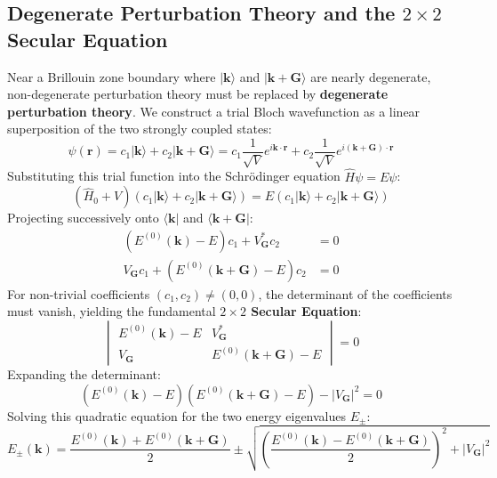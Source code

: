 \documentclass[11pt,a4paper]{article}
\newcommand{\vb}[1]{\mathbf{#1}}
\begin{document}
\subsection{Degenerate Perturbation Theory and the $2\times 2$ Secular Equation}
Near a Brillouin zone boundary where $|\vb{k}\rangle$ and $|\vb{k}+\vb{G}\rangle$ are nearly degenerate, non-degenerate perturbation theory must be replaced by \textbf{degenerate perturbation theory}. We construct a trial Bloch wavefunction as a linear superposition of the two strongly coupled states:
\begin{equation}
\psi(\vb{r}) = c_1 |\vb{k}\rangle + c_2 |\vb{k}+\vb{G}\rangle = c_1 \frac{1}{\sqrt{V}}e^{i\vb{k}\cdot\vb{r}} + c_2 \frac{1}{\sqrt{V}}e^{i(\vb{k}+\vb{G})\cdot\vb{r}}
\label{eq:two_wave_superposition}
\end{equation}
Substituting this trial function into the Schrödinger equation $\hat{H}\psi = E\psi$:
\begin{equation}
(\hat{H}_0 + V) \left( c_1 |\vb{k}\rangle + c_2 |\vb{k}+\vb{G}\rangle \right) = E \left( c_1 |\vb{k}\rangle + c_2 |\vb{k}+\vb{G}\rangle \right)
\end{equation}
Projecting successively onto $\langle \vb{k}|$ and $\langle \vb{k}+\vb{G}|$:
\begin{align}
\left( E^{(0)}(\vb{k}) - E \right) c_1 + V_{\vb{G}}^* c_2 &= 0 \\
V_{\vb{G}} c_1 + \left( E^{(0)}(\vb{k}+\vb{G}) - E \right) c_2 &= 0
\end{align}
For non-trivial coefficients $(c_1, c_2) \neq (0, 0)$, the determinant of the coefficients must vanish, yielding the fundamental \textbf{$2\times 2$ Secular Equation}:
\begin{equation}
\begin{vmatrix}
E^{(0)}(\vb{k}) - E & V_{\vb{G}}^* \\
V_{\vb{G}} & E^{(0)}(\vb{k}+\vb{G}) - E
\end{vmatrix} = 0
\label{eq:secular_determinant}
\end{equation}
Expanding the determinant:
\begin{equation}
\left( E^{(0)}(\vb{k}) - E \right)\left( E^{(0)}(\vb{k}+\vb{G}) - E \right) - |V_{\vb{G}}|^2 = 0
\label{eq:secular_quadratic}
\end{equation}
Solving this quadratic equation for the two energy eigenvalues $E_\pm$:
\begin{equation}
E_\pm(\vb{k}) = \frac{E^{(0)}(\vb{k}) + E^{(0)}(\vb{k}+\vb{G})}{2} \pm \sqrt{ \left( \frac{E^{(0)}(\vb{k}) - E^{(0)}(\vb{k}+\vb{G})}{2} \right)^2 + |V_{\vb{G}}|^2 }
\label{eq:nfe_eigenvalues_full}
\end{equation}
\end{document}
